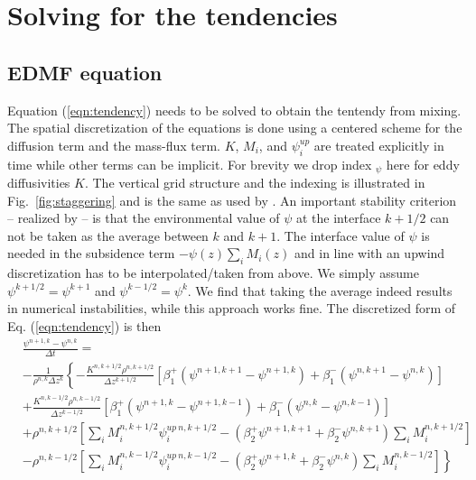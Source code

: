 \documentclass[dvipdfmx,a4paper,10pt]{article}
\begin{document}
\section{Solving for the tendencies}\label{sec:solve}

\subsection{EDMF equation}

Equation (\ref{eqn:tendency}) needs to be solved to obtain the tentendy from mixing. The spatial discretization of the equations is done using a centered scheme for the diffusion term and the mass-flux term. $K$, $M_i$, and $\psi^{up}_i$ are treated explicitly in time while other terms can be implicit. 
For brevity we drop index $_\psi$ here for eddy diffusivities $K$. The vertical grid structure and the indexing is illustrated in Fig.~\ref{fig:staggering} and is the same as used by \cite{tiedtke89}. An important stability criterion -- realized by \cite{tiedtke89} -- is that the environmental value of $\psi$ at the interface $k+1/2$ can not be taken as the average between $k$ and $k+1$. The interface value of $\psi$ is needed in the subsidence term $- \psi(z) \sum_i M_i(z)$ and in line with an upwind discretization has to be interpolated/taken from above. We simply assume $\psi^{k+1/2}=\psi^{k+1}$ and  $\psi^{k-1/2}=\psi^{k}$. We find that taking the average indeed results in numerical instabilities, while this approach works fine. The discretized form of Eq. (\ref{eqn:tendency}) is then
\begin{align*}
  &\frac{\psi^{n+1,k}- \psi^{n,k} }{\Delta t} =\\
  &-\frac{1}{\rho^{n,k}\Delta z^{k}}\left\{ -\frac{K^{n,k+1/2}\rho^{n,k+1/2} }{\Delta z^{k+1/2}} [\beta_1^+(\psi^{n+1,k+1}-\psi^{n+1,k}) + \beta_1^-(\psi^{n,k+1}-\psi^{n,k})] \right. \\
    & \left.+\frac{K^{n,k-1/2}\rho^{n,k-1/2} }{\Delta z^{k-1/2}} [\beta_1^+(\psi^{n+1,k}-\psi^{n+1,k-1}) + \beta_1^-(\psi^{n,k}-\psi^{n,k-1})] \right.\\
    & \left. +\rho^{n,k+1/2}\left[\sum_i M_i^{n,k+1/2}\psi_i^{up~n,k+1/2} - (\beta_2^+\psi^{n+1,k+1}+\beta_2^-\psi^{n,k+1} )\sum_i M_i^{n,k+1/2} \right]\right.\\
    &\left.-\rho^{n,k-1/2}\left[\sum_i M_i^{n,k-1/2}\psi_i^{up~n,k-1/2} -(\beta_2^+\psi^{n+1,k}+\beta_2^-\psi^{n,k} )\sum_i M_i^{n,k-1/2} \right] \right\}\\
\end{align*}
\end{document}
